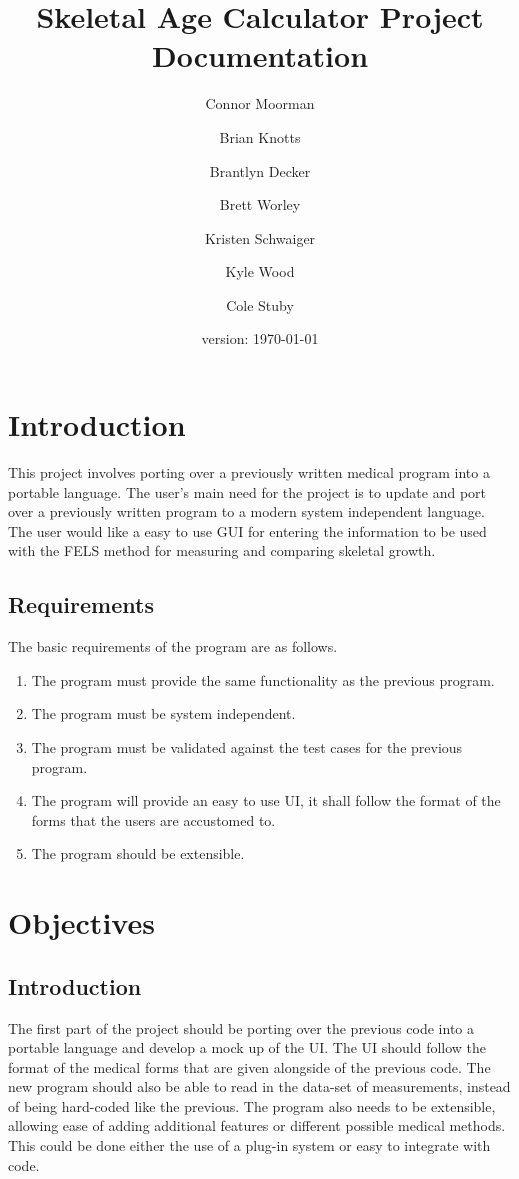 \documentclass[12pt,letterpaper]{article}
\author{Connor Moorman \and Brian Knotts \and Brantlyn Decker \and Brett Worley \and Kristen Schwaiger \and Kyle Wood \and Cole Stuby}
\title{Skeletal Age Calculator Project Documentation}
\date{version: \today}
\begin{document}
\maketitle
\tableofcontents

\section{Introduction}

This project involves porting over a previously written medical program into a portable language. The user's main need for the project is to update and port over a previously written program to a modern system independent language. The user would like a easy to use GUI for entering the information to be used with the FELS method for measuring and comparing skeletal growth.

\subsection{Requirements}

The basic requirements of the program are as follows.

\begin{enumerate}

\item The program must provide the same functionality as the previous program.
\item The program must be system independent.
\item The program must be validated against the test cases for the previous program.
\item The program will provide an easy to use UI, it shall follow the format of the forms that the users are accustomed to.
\item The program should be extensible.

\end{enumerate}

\section{Objectives}

\subsection{Introduction}

The first part of the project should be porting over the previous code into a portable language and develop a mock up of the UI. The UI should follow the format of the medical forms that are given alongside of the previous code. The new program should also be able to read in the data-set of measurements, instead of being hard-coded like the previous. The program also needs to be extensible, allowing ease of adding additional features or different possible medical methods. This could be done either the use of a plug-in system or easy to integrate with code.
\end{document}
